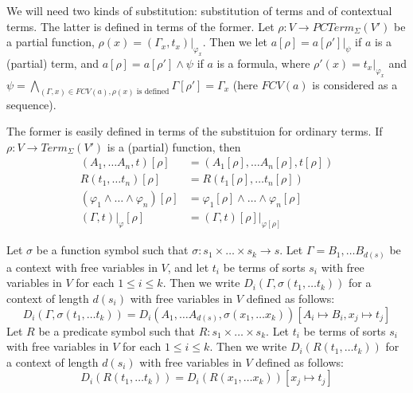 \documentclass[reqno]{amsart}
\theoremstyle{definition}
\theoremstyle{remark}
\numberwithin{figure}{section}
\begin{document}
We will need two kinds of substitution: substitution of terms and of contextual terms.
The latter is defined in terms of the former.
Let $\rho : V \to PCTerm_\Sigma(V')$ be a partial function, $\rho(x) = (\Gamma_x,t_x)|_{\varphi_x}$.
Then we let $a[\rho] = a[\rho']|_\psi$ if $a$ is a (partial) term, and $a[\rho] = a[\rho'] \land \psi$ if $a$ is a formula,
where $\rho'(x) = t_x|_{\varphi_x}$ and $\psi = \bigwedge\limits_{(\Gamma,x) \in FCV(a), \rho(x) \text{ is defined}} \Gamma[\rho'] = \Gamma_x$
(here $FCV(a)$ is considered as a sequence).

The former is easily defined in terms of the substituion for ordinary terms.
If  $\rho : V \to Term_\Sigma(V')$ is a (partial) function, then
\begin{align*}
(A_1, \ldots A_n, t)[\rho] & = (A_1[\rho], \ldots A_n[\rho], t[\rho]) \\
R(t_1, \ldots t_n)[\rho] & = R(t_1[\rho], \ldots t_n[\rho]) \\
(\varphi_1 \land \ldots \land \varphi_n)[\rho] & = \varphi_1[\rho] \land \ldots \land \varphi_n[\rho] \\
(\Gamma,t)|_\varphi[\rho] & = (\Gamma,t)[\rho]|_{\varphi[\rho]}
\end{align*}

Let $\sigma$ be a function symbol such that $\sigma : s_1 \times \ldots \times s_k \to s$.
Let $\Gamma = B_1, \ldots B_{d(s)}$ be a context with free variables in $V$, and let $t_i$ be terms of sorts $s_i$ with free variables in $V$ for each $1 \leq i \leq k$.
Then we write $D_i(\Gamma, \sigma(t_1, \ldots t_k))$ for a context of length $d(s_i)$ with free variables in $V$ defined as follows:
\[ D_i(\Gamma, \sigma(t_1, \ldots t_k)) = D_i(A_1, \ldots A_{d(s)}, \sigma(x_1, \ldots x_k))[A_i \mapsto B_i, x_j \mapsto t_j] \]
Let $R$ be a predicate symbol such that $R : s_1 \times \ldots \times s_k$.
Let $t_i$ be terms of sorts $s_i$ with free variables in $V$ for each $1 \leq i \leq k$.
Then we write $D_i(R(t_1, \ldots t_k))$ for a context of length $d(s_i)$ with free variables in $V$ defined as follows:
\[ D_i(R(t_1, \ldots t_k)) = D_i(R(x_1, \ldots x_k))[x_j \mapsto t_j] \]
\end{document}
